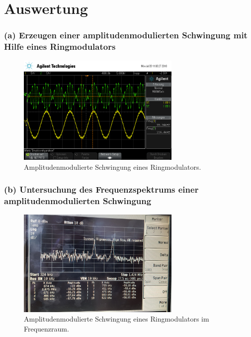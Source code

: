 \section{Auswertung}
\label{sec:Auswertung}


\subsubsection{(a) Erzeugen einer amplitudenmodulierten Schwingung mit
Hilfe eines Ringmodulators}
\label{subsubsec:auswertung_a}

\begin{figure}
  \centering
  \includegraphics[width=0.7\textwidth]{osci/amp_ringmodulator.png}
  \caption{Amplitudenmodulierte
  Schwingung eines Ringmodulators.}
  \label{fig:ringamp_zeit}
\end{figure}


\subsubsection{(b) Untersuchung des Frequenzspektrums einer
amplitudenmodulierten Schwingung}
\label{subsubsec:auswertung_b}

\begin{figure}
  \centering
  \includegraphics[width=0.7\textwidth]{spec/frequenzbereich_klein_ring.jpg}
  \caption{Amplitudenmodulierte
  Schwingung eines Ringmodulators im Frequenzraum.}
  \label{fig:ringamp_frequenz}
\end{figure}



